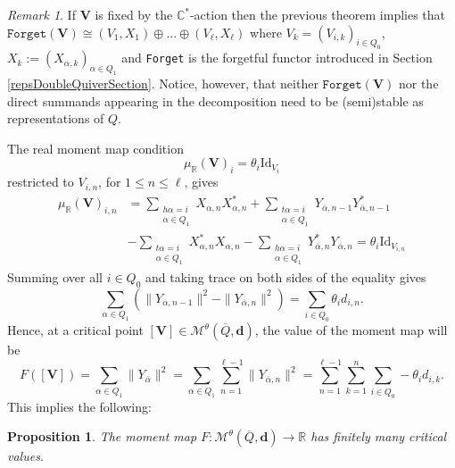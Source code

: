\documentclass{amsart}
\theoremstyle{plain}
\newtheorem{proposition}[theorem]{Proposition}
\numberwithin{equation}{section}
\theoremstyle{definition}
\theoremstyle{remark}
\newtheorem{remark}[theorem]{Remark}
\begin{document}
	\begin{remark}\label{underlyingRepOfQSplits}
		If $\mathbf{V}$ is fixed by the $\mathbb{C}^*$-action then the previous theorem implies that $\texttt{Forget}(\mathbf{V})\cong (V_1,X_1)\oplus\ldots\oplus(V_\ell,X_\ell)$ where $V_k=(V_{i,k})_{i\in Q_0}$,  $X_k:=(X_{\alpha,k})_{\alpha\in Q_1}$ and \texttt{Forget} is the forgetful functor introduced in Section \ref{repsDoubleQuiverSection}. Notice, however, that neither $\texttt{Forget}(\mathbf{V})$ nor the direct summands appearing in the decomposition need to be (semi)stable as representations of $Q$.  
	\end{remark}
	The real moment map condition 
	$$
	\mu_\mathbb{R}(\mathbf{V})_i=\theta_{i}\text{Id}_{V_i}
	$$
	restricted to $V_{i,n}$, for $1\leq n \leq \ell$, gives
	\begin{align*}
		\mu_{\mathbb{R}}(\mathbf{V})_{i,n}&=
		\sum_{\substack{h\alpha=i\\\alpha\in Q_1}}X_{\alpha,n}X_{\alpha,n}^*+\sum_{\substack{t\alpha=i\\\alpha\in Q_1}}Y_{\overline{\alpha},n-1}Y_{\overline{\alpha},n-1}^* \\ &- \sum_{\substack{t\alpha=i\\\alpha\in Q_1}} X_{\alpha,n}^*X_{\alpha,n}- \sum_{\substack{h\alpha=i\\\alpha\in Q_1}}Y_{\overline{\alpha},n}^*Y_{\overline{\alpha},n}=\theta_{i}\text{Id}_{V_{i,n}}
	\end{align*}
	Summing over all $i\in Q_0$ and taking trace on both sides of the equality gives 
	$$
	\sum_{\alpha\in Q_1}(\|Y_{\overline{\alpha},n-1}\|^2-\|Y_{\overline{\alpha},n}\|^2)=\sum_{i\in Q_0}\theta_{i}d_{i,n}.
	$$
	Hence, at a critical point $[\mathbf{V}]\in \mathcal{M}^{\theta}(\overline{Q},\mathbf{d})$, the value of the moment map will be 
	$$
	F([\mathbf{V}])=\sum_{\alpha\in Q_1}\|Y_{\overline{\alpha}}\|^2=\sum_{\alpha\in Q_1}\sum_{n=1}^{\ell-1}\|Y_{\overline{\alpha},n}\|^2=\sum_{n=1}^{\ell-1}\sum_{k=1}^{n}\sum_{i\in Q_0}-\theta_{i}d_{i,k}.
	$$
	This implies the following:
	\begin{proposition}
		The moment map $F:\mathcal{M}^{\theta}(\overline{Q},\mathbf{d})\to \mathbb{R}$ has finitely many critical values. 
	\end{proposition}
	
\end{document}
